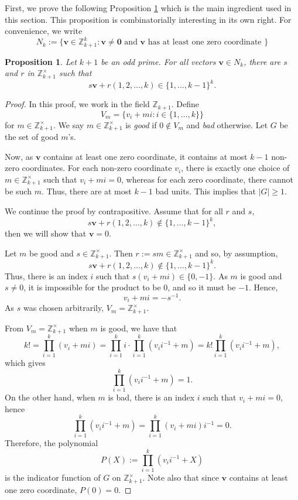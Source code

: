 \documentclass[11pt]{amsart}
\newcommand{\Unit}[1]{\Z_{#1}^\times}
\newcommand{\Z}{\mathbb{Z}}
\newcommand{\vbf}{\mathbf{v}}
\newcommand{\onetok}{(1, 2, \dots, k)}
\newtheorem{proposition}[theorem]{Proposition}
\theoremstyle{definition}
\theoremstyle{remark}
\begin{document}
First, we prove the following Proposition \ref{prop:polynomial} which is the main ingredient used in this section.
This proposition is combinatorially interesting in its own right.
For convenience, we write 
\[ N_{k} := \{ \vbf \in \Z_{k+1}^k : \vbf \ne \mathbf0 \text{ and } \vbf \text{ has at least one zero coordinate } \} \]
\begin{proposition}
\label{prop:polynomial}
    Let $k+1$ be an odd prime. For all vectors $\vbf \in N_k$,
    there are $s$ and $r$ in $\Unit{k+1}$ such that
    \[s\vbf + r\onetok  \in  \{1,\ldots,k-1\}^k.\]
\end{proposition}
\begin{proof}
    In this proof, we work in the field $\Z_{k+1}$.
    Define \[V_m = \{v_i+mi:i\in \{1,\ldots,k\} \}\] for $m \in \Unit{k+1}$.
    We say $m\in \Unit{k+1}$ is \emph{good} if $0 \notin V_m$ and \emph{bad} otherwise. 
    Let $G$ be the set of good $m$'s.

    Now, as $\vbf$ contains at least one zero coordinate, it contains at most $k-1$ non-zero coordinates.
    For each non-zero coordinate $v_i$, there is exactly one choice of $m\in\Unit{k+1}$ such that $v_i + m i = 0$, 
    whereas for each zero coordinate, there cannot be such $m$. 
    Thus, there are at most $k-1$ bad units.
    This implies that $|G| \ge 1$.

    We continue the proof by contrapositive. Assume that for all $r$ and $s$, 
    \[s\vbf + r\onetok  \notin  \{1,\ldots,k-1\}^k,\] then we will show that $\vbf = 0$.

    Let $m$ be good and $s\in\Unit{k+1}$. Then $r:=sm\in\Unit{k+1}$ and so, by assumption,
    \[ s\vbf + r\onetok \not\in \{1, \dots, k-1\}^k. \]
    Thus, there is an index $i$ such that $s (v_i + m i) \in \{0, -1\}$.
    As $m$ is good and $s\neq0$, it is impossible for the product to be $0$, and so it must be $-1$. Hence, 
    \[ v_i + m i = -s^{-1}. \]
    As $s$ was chosen arbitrarily, $V_m = \Unit{k+1}$.

    From $V_m = \Unit{k+1}$ when $m$ is good, we have that
    \[k! = \prod_{i=1}^k(v_i+mi) = \prod_{i=1}^k i \cdot \prod_{i=1}^k (v_i i^{-1} + m) = k!\prod_{i=1}^k (v_i i^{-1}+m),\]
    which gives \[\prod_{i=1}^k (v_i i^{-1} + m) = 1.\]
    On the other hand, when $m$ is bad, there is an index $i$ such that $v_i + m i = 0$, hence 
    \[ \prod_{i=1}^k (v_i i^{-1} + m) = \prod_{i=1}^k (v_i + m i) i^{-1} = 0. \]
    Therefore, the polynomial \[ P(X) := \prod_{i=1}^k (v_ii^{-1}+X) \] is the indicator function of $G$ on $\Unit{k+1}$.
    Note also that since $\vbf$ contains at least one zero coordinate, $P(0) = 0$.


\end{proof}
\end{document}
